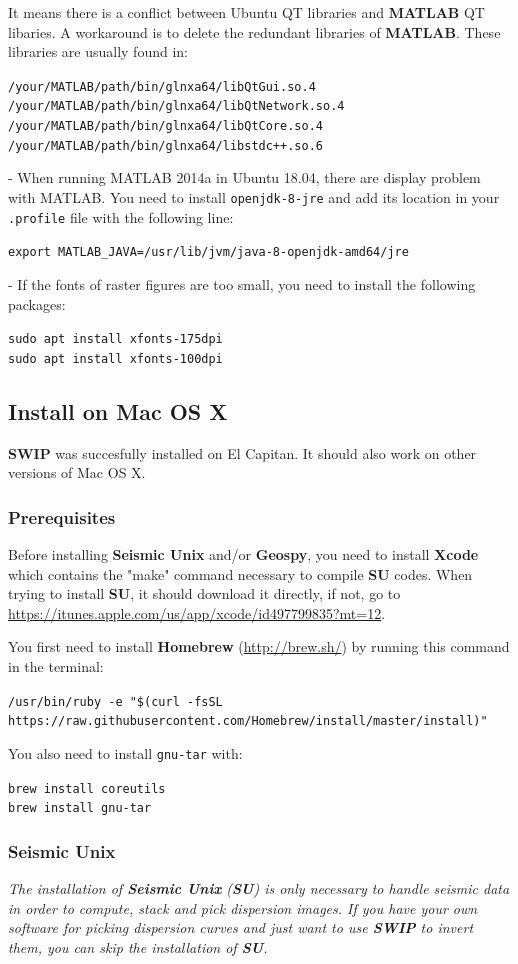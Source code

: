 \documentclass[twoside,a4paper]{article}
\def\SWIP{\textbf{SWIP}}
\def\SU{\textbf{SU}}
\def\SeismicUnix{\textbf{Seismic Unix}}
\def\Geopsy{\textbf{Geospy}}
\def\MATLAB{\textbf{MATLAB}}
\begin{document}
It means there is a conflict between Ubuntu QT libraries and {\MATLAB} QT libaries. A workaround is to delete the redundant libraries of {\MATLAB}. These libraries are usually found in:

\verb|/your/MATLAB/path/bin/glnxa64/libQtGui.so.4|\\
\verb|/your/MATLAB/path/bin/glnxa64/libQtNetwork.so.4|\\
\verb|/your/MATLAB/path/bin/glnxa64/libQtCore.so.4|\\
\verb|/your/MATLAB/path/bin/glnxa64/libstdc++.so.6|

- When running MATLAB 2014a in Ubuntu 18.04, there are display problem with MATLAB. You need to install \verb|openjdk-8-jre| and add its location in your \verb|.profile| file with the following line:

\verb|export MATLAB_JAVA=/usr/lib/jvm/java-8-openjdk-amd64/jre|

- If the fonts of raster figures are too small, you need to install the following packages:

\verb|sudo apt install xfonts-175dpi|\\
\verb|sudo apt install xfonts-100dpi|

\clearpage
\subsection{Install on Mac OS X}
{\SWIP} was succesfully installed on El Capitan. It should also work on other versions of Mac OS X.
\subsubsection{Prerequisites}
Before installing {\SeismicUnix} and/or {\Geopsy}, you need to install \textbf{Xcode} which contains the "make" command necessary to compile {\SU} codes. When trying to install {\SU}, it should download it directly, if not, go to \url{https://itunes.apple.com/us/app/xcode/id497799835?mt=12}.

You first need to install \textbf{Homebrew} (\url{http://brew.sh/}) by running this command in the terminal:

\verb|/usr/bin/ruby -e "$(curl -fsSL https://raw.githubusercontent.com/Homebrew/install/master/install)"|

You also need to install \verb|gnu-tar| with:

\verb|brew install coreutils|\\
\verb|brew install gnu-tar|

\subsubsection{Seismic Unix}
\textit{The installation of {\SeismicUnix} ({\SU}) is only necessary to handle seismic data in order to compute, stack and pick dispersion images. If you have your own software for picking dispersion curves and just want to use {\SWIP} to invert them, you can skip the installation of {\SU}.}
\end{document}
